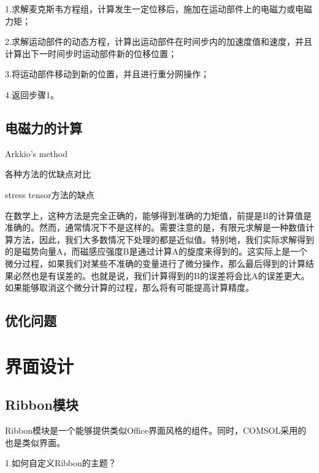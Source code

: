 1.求解麦克斯韦方程组，计算发生一定位移后，施加在运动部件上的电磁力或电磁力矩；

2.求解运动部件的动态方程，计算出运动部件在时间步内的加速度值和速度，并且计算出下一时间步时运动部件新的位移位置；

3.将运动部件移动到新的位置，并且进行重分网操作；

4.返回步骤1。

\subsection{电磁力的计算}

Arkkio’s method


各种方法的优缺点对比

stress tensor方法的缺点

在数学上，这种方法是完全正确的，能够得到准确的力矩值，前提是B的计算值是准确的。然而，通常情况下不是这样的。需要注意的是，有限元求解是一种数值计算方法，因此，我们大多数情况下处理的都是近似值。特别地，我们实际求解得到的是磁势向量A，而磁感应强度B是通过计算A的旋度来得到的。这实际上是一个微分过程，如果我们对某些不准确的变量进行了微分操作，那么最后得到的计算结果必然也是有误差的。也就是说，我们计算得到的B的误差将会比A的误差更大。如果能够取消这个微分计算的过程，那么将有可能提高计算精度。
\subsection{优化问题}

\section{界面设计}

\subsection{Ribbon模块}
Ribbon模块是一个能够提供类似Office界面风格的组件。同时，COMSOL采用的也是类似界面。

1.如何自定义Ribbon的主题？
